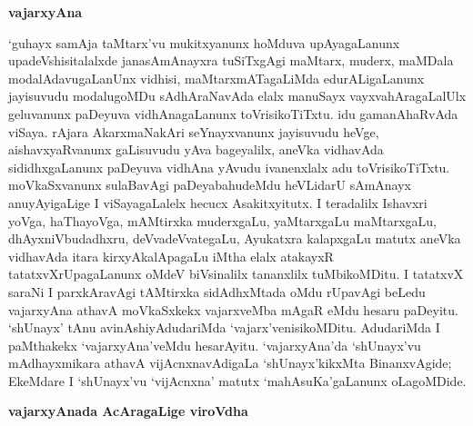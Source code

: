 \newpage

\begin{center}
{\Large\bf vajarxyAna}
\end{center}

`guhayx samAja taMtarx'vu mukitxyanunx hoMduva upAyagaLanunx upadeVshisi\-talalxde janasAmAnayxra tuSiTxgAgi maMtarx, muderx, maMDala modalAdavugaLanUnx vidhisi, maMtarxmATagaLiMda edurALigaLanunx jayisuvudu modalugoMDu sAdhAraNavAda elalx manuSayx vayxvahAragaLalUlx geluvanunx paDeyuva vidhAnagaLanunx toVrisikoTiTxtu. idu gamanAhaRvAda viSaya. rAjara AkarxmaNakAri seYnayxvanunx jayisuvudu heVge, aishavxyaRvanunx gaLisuvudu yAva bageyalilx, aneVka vidhavAda sididhxgaLanunx paDeyuva vidhAna yAvudu ivanenxlalx adu toVrisikoTiTxtu. moVkaSxvanunx sulaBavAgi paDeyabahudeMdu heVLidarU sAmAnayx anuyAyigaLige I viSayagaLalelx hecucx Asakitxyitutx. I teradalilx Ishavxri yoVga, haThayoVga, mAMtirxka muderxgaLu, yaMtarxgaLu maMtarxgaLu, dhAyxniVbudadhxru, deVvadeVvategaLu, Ayukatxra kalapxgaLu matutx aneVka vidhavAda itara kirxyAkalApagaLu iMtha elalx atakayxR tatatxvXrUpagaLanunx oMdeV biVsinalilx tananxlilx tuMbikoMDitu. I tatatxvX saraNi I parxkAravAgi tAMtirxka sidAdhxMtada oMdu rUpavAgi beLedu vajarxyAna athavA moVkaSxkekx vajarxveMba mAgaR eMdu hesaru paDeyitu. `shUnayx' tAnu avinAshiyAdudariMda `vajarx'venisikoMDitu. AdudariMda I paMthakekx `vajarxyAna'veMdu hesarAyitu. `vajarxyAna'da `shUnayx'vu mAdhayxmikara athavA vijAcnxnavAdigaLa `shUnayx'kikxMta BinanxvAgide; EkeMdare I `shUnayx'vu `vijAcnxna' matutx `mahAsuKa'gaLanunx oLagoMDide.

\begin{center}
{\Large\bf vajarxyAnada AcAragaLige viroVdha}
\end{center}

